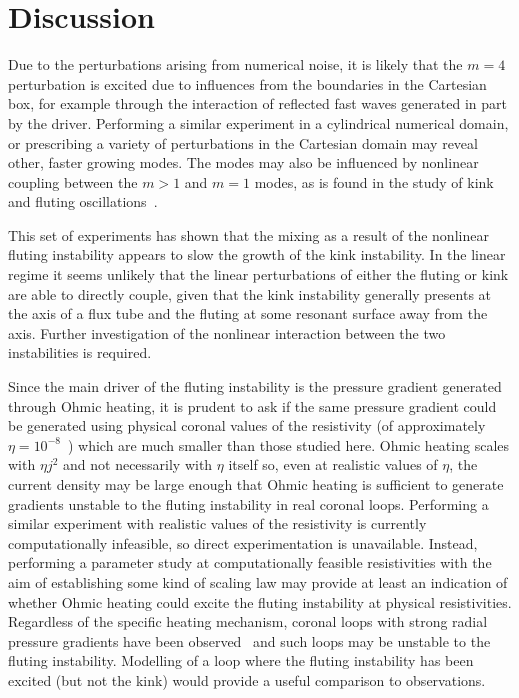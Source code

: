 \section{Discussion}

Due to the perturbations arising from numerical noise, it is likely that the $m=4$ perturbation is excited due to influences from the boundaries in the Cartesian box, for example through the interaction of reflected fast waves generated in part by the driver. Performing a similar experiment in a cylindrical numerical domain, or prescribing a variety of perturbations in the Cartesian domain may reveal other, faster growing modes. The modes may also be influenced by nonlinear coupling between the $m>1$ and $m=1$ modes, as is found in the study of kink and fluting oscillations~\cite{terradasEffectMagneticTwist2018,rudermanNonlinearGenerationFluting2017a}.

This set of experiments has shown that the mixing as a result of the nonlinear fluting instability appears to slow the growth of the kink instability. In the linear regime it seems unlikely that the linear perturbations of either the fluting or kink are able to directly couple, given that the kink instability generally presents at the axis of a flux tube and the fluting at some resonant surface away from the axis. Further investigation of the nonlinear interaction between the two instabilities is required.

Since the main driver of the fluting instability is the pressure gradient generated through Ohmic heating, it is prudent to ask if the same pressure gradient could be generated using physical coronal values of the resistivity (of approximately $\eta=10^{-8}$~\cite{craigAnisotropicViscousDissipation2009a}) which are much smaller than those studied here. Ohmic heating scales with $\eta j^2$ and not necessarily with $\eta$ itself so, even at realistic values of $\eta$, the current density may be large enough that Ohmic heating is sufficient to generate gradients unstable to the fluting instability in real coronal loops. Performing a similar experiment with realistic values of the resistivity is currently computationally infeasible, so direct experimentation is unavailable. Instead, performing a parameter study at computationally feasible resistivities with the aim of establishing some kind of scaling law may provide at least an indication of whether Ohmic heating could excite the fluting instability at physical resistivities. Regardless of the specific heating mechanism, coronal loops with strong radial pressure gradients have been observed~\cite{foukalTemperatureStructurePressure1975} and such loops may be unstable to the fluting instability. Modelling of a loop where the fluting instability has been excited (but not the kink) would provide a useful comparison to observations.


